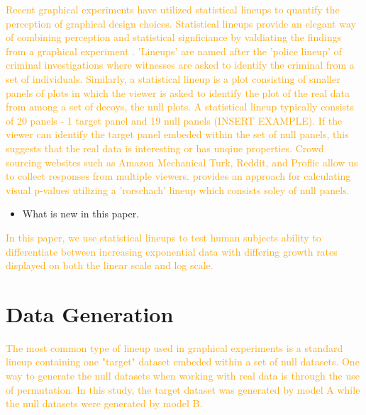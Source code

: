 \documentclass[]{interact}
\theoremstyle{plain}%
\theoremstyle{definition}
\theoremstyle{remark}
\def\tightlist{}
\begin{document}
\textcolor{Orange}{Recent graphical experiments have utilized statistical lineups to quantify the perception of graphical design choices\citep{vanderplas_clusters_2017}. 
Statistical lineups provide an elegant way of combining perception and statistical signficiance by valdiating the findings from a graphical experiment \citep{buja_statistical_2009, wickham2010graphical, hofmann_graphical_2012, majumder_validation_2013, vanderplas_clusters_2017}.
'Lineups' are named after the 'police lineup' of criminal investigations where witnesses are asked to identify the criminal from a set of individuals. 
Similarly, a statistical lineup is a plot consisting of smaller panels of plots in which the viewer is asked to identify the plot of the real data from among a set of decoys, the null plots. 
A statistical lineup typically consists of 20 panels - 1 target panel and 19 null panels (INSERT EXAMPLE). 
If the viewer can identify the target panel embeded within the set of null panels, this suggests that the real data is interesting or has unqiue properties.
Crowd sourcing websites such as Amazon Mechanical Turk, Reddit, and Proflic allow us to collect responses from multiple viewers.
\cite{vanderplas_statistical_nodate} provides an approach for calculating visual p-values utilizing a 'rorschach' lineup which consists soley of null panels.
}

\begin{itemize}
\tightlist
\item
  What is new in this paper.
\end{itemize}

\textcolor{Orange}{
In this paper, we use statistical lineups to test human subjects ability to differentiate between increasing exponential data with differing growth rates displayed on both the linear scale and log scale.
}

\hypertarget{data-generation}{%
\section{Data Generation}\label{data-generation}}

\textcolor{Orange}{
The most common type of lineup used in graphical experiments is a standard lineup containing one "target" dataset embeded within a set of null datasets. 
One way to generate the null datasets when working with real data is through the use of permutation. In this study, the target dataset was generated by model A while the null datasets were generated by model B.
}
\end{document}
